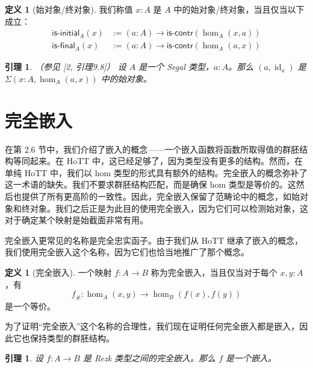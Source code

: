 \documentclass{ctexrep}
\theoremstyle{plain}
\newtheorem{lemma}[theorem]{引理}
\theoremstyle{definition}
\newtheorem{definition}[theorem]{定义}
\theoremstyle{remark}
\theoremstyle{definition}
\theoremstyle{definition}
\theoremstyle{definition}
\newcommand{\coloneqq}{\mathrel{:=}}
\newcommand{\id}{\operatorname{id}}
\newcommand{\iscontr}{\mathsf{is\text{-}contr}}
\newcommand{\isinitial}{\mathsf{is\text{-}initial}}
\newcommand{\isfinal}{\mathsf{is\text{-}final}}
\begin{document}
\begin{definition}[始对象/终对象]
我们称值 $x:A$ 是 $A$ 中的始对象/终对象，当且仅当以下成立：
\begin{align*}
\isinitial_A(x) &\coloneqq (a:A) \to \iscontr(\hom_A(x,a)) \\
\isfinal_A(x) &\coloneqq (a:A) \to \iscontr(\hom_A(a,x))
\end{align*}
\end{definition}

\begin{lemma}（参见 [2, 引理9.8]）
设 $A$ 是一个 Segal 类型，$a:A$。那么 $(a,\id_a)$ 是 $\Sigma(x:A,\hom_A(a,x))$ 中的始对象。
\end{lemma}

\section{完全嵌入}

在第 2.6 节中，我们介绍了嵌入的概念——一个嵌入函数将函数所取得值的群胚结构等同起来。在 HoTT 中，这已经足够了，因为类型没有更多的结构。然而，在单纯 HoTT 中，我们以 hom 类型的形式具有额外的结构。完全嵌入的概念弥补了这一术语的缺失。我们不要求群胚结构匹配，而是确保 hom 类型是等价的。这然后也提供了所有更高阶的一致性。因此，完全嵌入保留了范畴论中的概念，如始对象和终对象。我们之后正是为此目的使用完全嵌入，因为它们可以检测始对象，这对于确定某个映射是始截面非常有用。

完全嵌入更常见的名称是完全忠实函子。由于我们从 HoTT 继承了嵌入的概念，我们使用完全嵌入这个名称，因为它们也恰当地推广了那个概念。

\begin{definition}[完全嵌入]
一个映射 $f:A\to B$ 称为完全嵌入，当且仅当对于每个 $x,y:A$，有
\[
f_{\#} : \hom_A(x,y) \to \hom_B(f(x),f(y))
\]
是一个等价。
\end{definition}

为了证明“完全嵌入”这个名称的合理性，我们现在证明任何完全嵌入都是嵌入，因此它也保持类型的群胚结构。

\begin{lemma}
设 $f:A\to B$ 是 Rezk 类型之间的完全嵌入。那么 $f$ 是一个嵌入。
\end{lemma}
\end{document}
